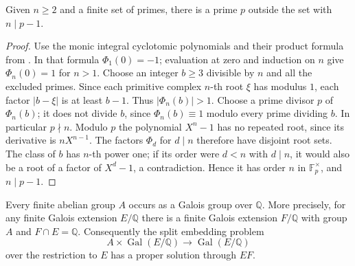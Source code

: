 \begin{lemma}
\label{res:IG15}
Given \(n\geq2\) and a finite set of primes, there is a prime
\(p\) outside the set with \(n\mid p-1\).
\end{lemma}

\begin{proof}
Use the monic integral cyclotomic polynomials and their product
formula from \cite[Result K07.15.cyclotomic\_polynomials]{mg-d07}.
In that formula \(\Phi_1(0)=-1\); evaluation at zero and induction
on \(n\) give \(\Phi_n(0)=1\) for \(n>1\).
Choose an integer \(b\geq3\) divisible by \(n\) and all the
excluded primes. Since each primitive complex \(n\)-th root
\(\xi\) has modulus \(1\), each factor \(|b-\xi|\) is at least
\(b-1\). Thus \(|\Phi_n(b)|>1\). Choose a prime divisor \(p\)
of \(\Phi_n(b)\); it does not divide \(b\), since
\(\Phi_n(b)\equiv 1\) modulo every prime dividing \(b\).
In particular \(p\nmid n\). Modulo \(p\) the polynomial
\(X^n-1\) has no repeated root, since its derivative is
\(nX^{n-1}\). The factors \(\Phi_d\) for \(d\mid n\) therefore
have disjoint root sets. The class of \(b\) has \(n\)-th power
one; if its order were \(d<n\) with \(d\mid n\), it would
also be a root of a factor of \(X^d-1\), a contradiction.
Hence it has order \(n\) in \(\mathbb F_p^\times\), and
\(n\mid p-1\).
\end{proof}

\begin{theorem}
\label{res:IG16}
Every finite abelian group \(A\) occurs as a Galois group over
\(\mathbb Q\). More precisely, for any finite Galois extension
\(E/\mathbb Q\) there is a finite Galois extension \(F/\mathbb Q\)
with group \(A\) and \(F\cap E=\mathbb Q\). Consequently the
split embedding problem
\[
   A\times\operatorname{Gal}(E/\mathbb Q)
             \longrightarrow \operatorname{Gal}(E/\mathbb Q)
\]
over the restriction to \(E\) has a proper solution through \(EF\).
\end{theorem}

